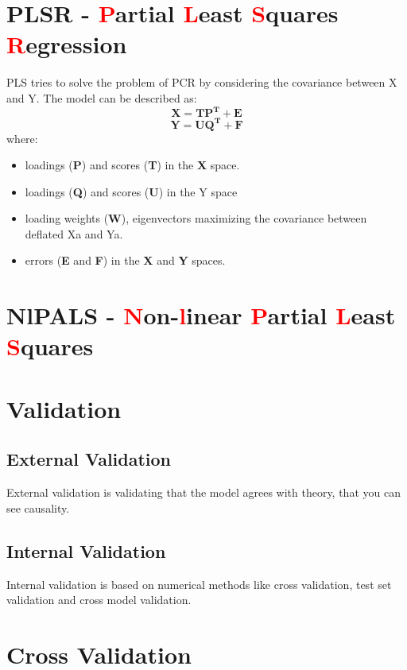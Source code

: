 \section{PLSR - \textcolor{red}{P}artial \textcolor{red}{L}east \textcolor{red}{S}quares \textcolor{red}{R}egression}
PLS tries to solve the problem of PCR by considering the covariance between X and Y. The model can be described as:
\begin{equation}
    \mathbf{
    X = TP^T + E
    }
\end{equation}
\begin{equation}
    \mathbf{
    Y = UQ^T + F
    }
\end{equation}
where:
\begin{itemize}
    \item loadings (\textbf{P}) and scores (\textbf{T}) in the \textbf{X} space.
    \item loadings (\textbf{Q}) and scores (\textbf{U}) in the Y space
    \item loading weights (\textbf{W}), eigenvectors maximizing the covariance between
    deflated Xa and Ya.
    \item errors (\textbf{E} and \textbf{F}) in the \textbf{X} and \textbf{Y} spaces.
\end{itemize}
\section{NlPALS - \textcolor{red}{N}on-\textcolor{red}{l}inear \textcolor{red}{P}artial \textcolor{red}{L}east \textcolor{red}{S}quares}

\section{Validation}

\subsection{External Validation}
External validation is validating that the model agrees with theory, that you can see causality.
\subsection{Internal Validation}
Internal validation is based on numerical methods like cross validation, test set validation and cross model validation. \newline


\section{Cross Validation}

